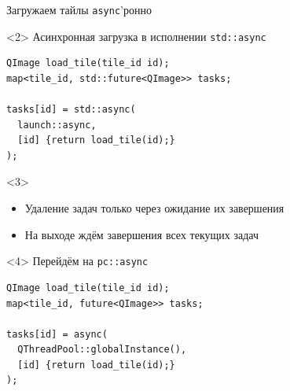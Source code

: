 \documentclass[aspectratio=169,hyperref={unicode},17pt]{beamer}
\begin{document}
\begin{frame}[fragile,t]{Загружаем тайлы \texttt{async}'ронно}
\begin{onlyenv}<2>
Асинхронная загрузка в исполнении \texttt{std::async}
\begin{lstlisting}[style=cppcode]
QImage load_tile(tile_id id);
map<tile_id, std::future<QImage>> tasks;

tasks[id] = std::async(
  launch::async,
  [id] {return load_tile(id);}
);
\end{lstlisting}
\end{onlyenv}
\begin{onlyenv}<3>
\begin{itemize}
 \item Удаление задач только через ожидание их завершения
 \item На выходе ждём завершения всех текущих задач
\end{itemize}
\end{onlyenv}
\begin{onlyenv}<4>
Перейдём на \texttt{pc::async}
\begin{lstlisting}[style=cppcode]
QImage load_tile(tile_id id);
map<tile_id, future<QImage>> tasks;

tasks[id] = async(
  QThreadPool::globalInstance(),
  [id] {return load_tile(id);}
);
\end{lstlisting}
\end{onlyenv}
\end{frame}
\end{document}
